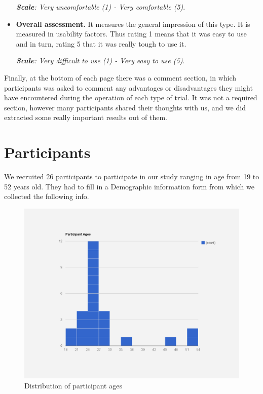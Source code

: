 \begin{itemize}
\emph{\textbf{Scale}: Very uncomfortable (1) - Very comfortable (5)}.

\item \textbf{Overall assessment.} It measures the general impression of this type. It is measured in usability factors. Thus rating 1 means that it was easy to use and in turn, rating 5 that it was really tough to use it.

\emph{\textbf{Scale}: Very difficult to use (1) - Very easy to use (5)}.
\end{itemize}

Finally, at the bottom of each page there was a comment section, in which participants was asked to comment any advantages or disadvantages they might have encountered during the operation of each type of trial. It was not a required section, however many participants shared their thoughts with us, and we did extracted some really important results out of them.









\section{Participants}

We recruited 26 participants to participate in our study ranging in age from 19 to 52 years old. They had to fill in a Demographic information form from which we collected the following info.

\begin{figure}[H]
\centering
\includegraphics[scale=0.3]{figures/participantAge.png}
\caption{Distribution of participant ages}
\label{fig:participantAge}
\end{figure}

